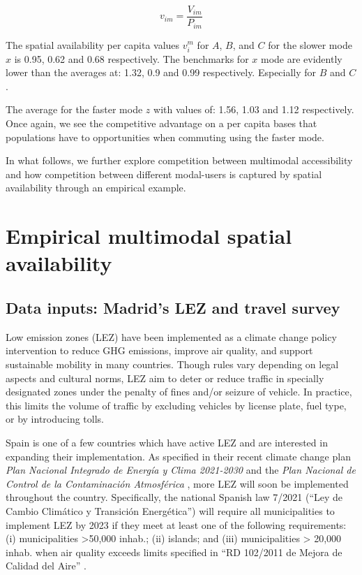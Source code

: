 \documentclass[]{trbunofficial}
\begin{document}
\begin{equation}
\label{eq:SA-per-capita}
v_{im} = \frac{V_{im}}{P_{im}}
\end{equation}

The spatial availability per capita values \(v_i^m\) for \(A\), \(B\),
and \(C\) for the slower mode \(x\) is 0.95, 0.62 and 0.68 respectively.
The benchmarks for \(x\) mode are evidently lower than the averages at:
1.32, 0.9 and 0.99 respectively. Especially for \(B\) and \(C\).

The average for the faster mode \(z\) with values of: 1.56, 1.03 and
1.12 respectively. Once again, we see the competitive advantage on a per
capita bases that populations have to opportunities when commuting using
the faster mode.

In what follows, we further explore competition between multimodal
accessibility and how competition between different modal-users is
captured by spatial availability through an empirical example.

\hypertarget{empirical-multimodal-spatial-availability}{%
\section{Empirical multimodal spatial
availability}\label{empirical-multimodal-spatial-availability}}

\hypertarget{data-inputs-madrids-lez-and-travel-survey}{%
\subsection{Data inputs: Madrid's LEZ and travel
survey}\label{data-inputs-madrids-lez-and-travel-survey}}

Low emission zones (LEZ) have been implemented as a climate change
policy intervention to reduce GHG emissions, improve air quality, and
support sustainable mobility in many countries. Though rules vary
depending on legal aspects and cultural norms, LEZ aim to deter or
reduce traffic in specially designated zones under the penalty of fines
and/or seizure of vehicle. In practice, this limits the volume of
traffic by excluding vehicles by license plate, fuel type, or by
introducing tolls.

Spain is one of a few countries which have active LEZ and are interested
in expanding their implementation. As specified in their recent climate
change plan \emph{Plan Nacional Integrado de Energía y Clima 2021-2030}
\citep{espanaPlanNacionalIntegrado2020} and the \emph{Plan Nacional de
Control de la Contaminación Atmosférica}
\citep{espanaResolucion10Enero2020}, more LEZ will soon be implemented
throughout the country. Specifically, the national Spanish law 7/2021
(``Ley de Cambio Climático y Transición Energética'') will require all
municipalities to implement LEZ by 2023 if they meet at least one of the
following requirements: (i) municipalities \textgreater50,000 inhab.;
(ii) islands; and (iii) municipalities \textgreater{} 20,000 inhab. when
air quality exceeds limits specified in ``RD 102/2011 de Mejora de
Calidad del Aire'' \citep{barcelonaGUIATECNICAPARA2021}.
\end{document}
